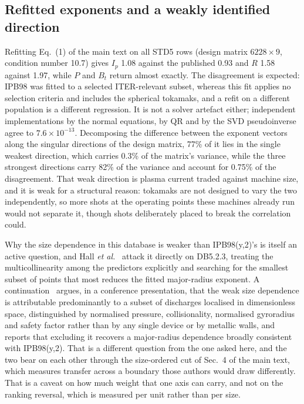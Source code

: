 \documentclass[12pt,letterpaper]{article}
\begin{document}
\subsection{Refitted exponents and a weakly identified direction}
\label{supp:refit}

Refitting Eq.~(1) of the main text on all STD5 rows (design matrix
$6228\times9$, condition number 10.7) gives $I_p$ 1.08 against the published
0.93 and $R$ 1.58 against 1.97, while $P$ and $B_t$ return almost exactly. The
disagreement is expected: IPB98 was fitted to a selected ITER-relevant subset,
whereas this fit applies no selection criteria and includes the spherical
tokamaks, and a refit on a different population is a different regression. It is
not a solver artefact either; independent implementations by the normal
equations, by QR and by the SVD pseudoinverse agree to $7.6\times10^{-13}$.
Decomposing the difference between the exponent vectors along the singular
directions of the design matrix, 77\% of it lies in the single weakest
direction, which carries 0.3\% of the matrix's variance, while the three
strongest directions carry 82\% of the variance and account for 0.75\% of the
disagreement. That weak direction is plasma current traded against machine size,
and it is weak for a structural reason: tokamaks are not designed to vary the
two independently, so more shots at the operating points these machines already
run would not separate it, though shots deliberately placed to break the
correlation could.

Why the size dependence in this database is weaker than IPB98(y,2)'s is itself
an active question, and Hall \emph{et al.}~\cite{hall} attack it directly on
DB5.2.3, treating the multicollinearity among the predictors explicitly and
searching for the smallest subset of points that most reduces the fitted
major-radius exponent. A continuation~\cite{hall26} argues, in a conference
presentation, that the weak size dependence is attributable predominantly to a
subset of discharges localised in dimensionless space, distinguished by
normalised pressure, collisionality, normalised gyroradius and safety factor
rather than by any single device or by metallic walls, and reports that
excluding it recovers a major-radius dependence broadly consistent with
IPB98(y,2). That is a different question from the one asked here, and the two
bear on each other through the size-ordered cut of Sec.~4 of the main text, which
measures transfer across a boundary those authors would draw differently. That
is a caveat on how much weight that one axis can carry, and not on the ranking
reversal, which is measured per unit rather than per size.
\end{document}
